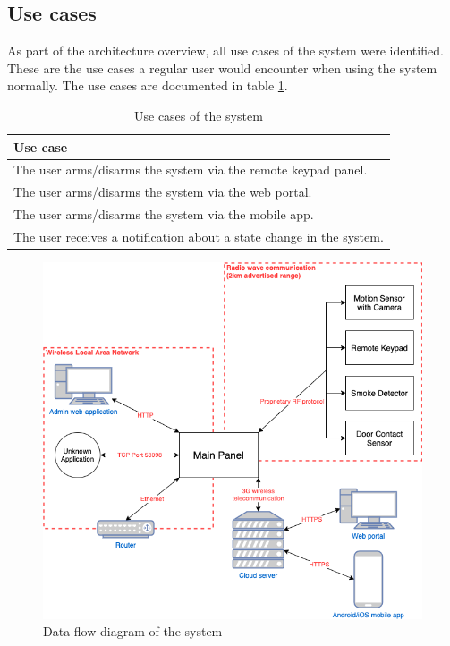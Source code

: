 \subsection{Use cases}
As part of the architecture overview, all use cases of the system were identified. These are the use cases a regular user would encounter when using the system normally. The use cases are documented in table \ref{tb:use-cases}.
\begin{table}[!ht]
    \centering
    \begin{tabular}{l}
        \hline
        \textbf{Use case}
        \\ \hline
        The user arms/disarms the system via the remote keypad panel.
        \\
        The user arms/disarms the system via the web portal.
        \\
        The user arms/disarms the system via the mobile app.
        \\
        The user receives a notification about a state change in the system.
        \\ \hline
    \end{tabular}
    \caption{Use cases of the system}
    \label{tb:use-cases}
\end{table}

\begin{figure}[!p]
    \centering
    \includegraphics[width=\textwidth]{images/5-threat-model/system-overview.png}
    \caption{Data flow diagram of the system}
    \label{fig:system-overview}
\end{figure}

